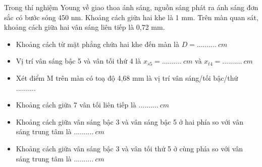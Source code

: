 \begin{vidu}%
Trong thí nghiệm Young về giao thoa ánh sáng, nguồn sáng phát ra ánh sáng đơn sắc có bước sóng 450 nm. Khoảng cách giữa hai khe là 1 mm. Trên màn quan sát, khoảng cách giữa hai vân sáng liên tiếp là 0,72 mm.
\begin{itemize}
\item[1.]  Khoảng cách từ mặt phẳng chứa hai khe đến màn là $D=..........\ cm$
\item[2.] Vị trí vân sáng bậc 5 và vân tối thứ 4 là $x_{s5}=..........\ cm$ và  $x_{t4}=..........\ cm$
\item[3.] Xét điểm M trên màn có toạ độ 4,68 mm là vị trí vân sáng/tối bậc/thứ .......... 
\item[4.] Khoảng cách giữa 7 vân tối liên tiếp là $..........\ cm$
\item[5.] Khoảng cách giữa vân sáng bậc 3 và vân sáng bậc 5 ở hai phía so với vân sáng trung tâm là $..........\ cm$
\item[6.] Khoảng cách giữa vân sáng bậc 3 và vân tối thứ 5 ở cùng phía so với vân sáng trung tâm là $..........\ cm$
\end{itemize}
\end{vidu} %

